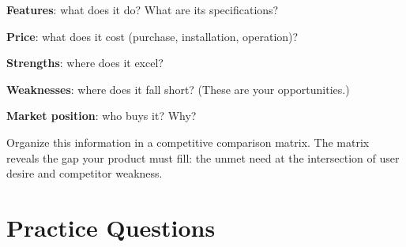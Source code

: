 \textbf{Features}: what does it do? What are its specifications?

\textbf{Price}: what does it cost (purchase, installation, operation)?

\textbf{Strengths}: where does it excel?

\textbf{Weaknesses}: where does it fall short? (These are your opportunities.)

\textbf{Market position}: who buys it? Why?

Organize this information in a competitive comparison matrix. The matrix reveals the gap your product must fill: the unmet need at the intersection of user desire and competitor weakness.
\section{Practice Questions}
